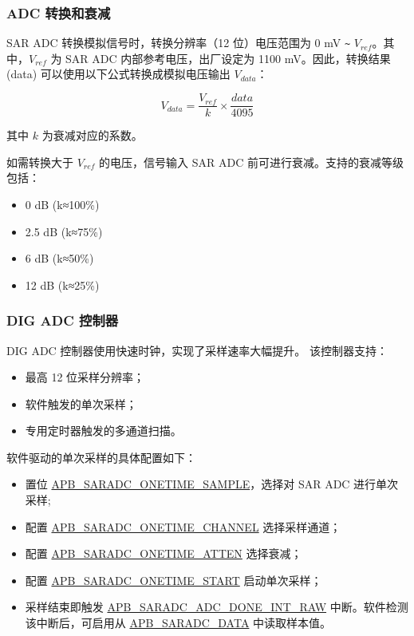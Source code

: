 \documentclass[main\_\_CN.tex]{subfiles}
\begin{document}
\subsubsection{ADC 转换和衰减}

SAR ADC 转换模拟信号时，转换分辨率（12 位）电压范围为 0 mV \verb+~+ \(V_{ref}\)。其中，\(V_{ref}\) 为 SAR ADC 内部参考电压，出厂设定为 1100 mV。因此，转换结果 (data) 可以使用以下公式转换成模拟电压输出 \(V_{data}\)：

    \[
    V_{data} = \frac{V_{ref}}{k}\times{\frac{data}{4095}}
    \]

其中 \(k\) 为衰减对应的系数。

如需转换大于 \(V_{ref}\) 的电压，信号输入 SAR ADC 前可进行衰减。支持的衰减等级包括：

\begin{itemize}
    \item 0 dB (k≈100\%)
    \item 2.5 dB (k≈75\%)
    \item 6 dB (k≈50\%)
    \item 12 dB (k≈25\%)
\end{itemize}

\subsubsection{DIG ADC 控制器}

DIG ADC 控制器使用快速时钟，实现了采样速率大幅提升。
该控制器支持：

\begin{itemize}
    \item 最高 12 位采样分辨率；
    \item 软件触发的单次采样；
    \item 专用定时器触发的多通道扫描。
\end{itemize}

软件驱动的单次采样的具体配置如下：
\begin{itemize}
    \item 置位 \hyperref[fielddesc:APBSARADCONETIMESAMPLE]{APB\_SARADC\_ONETIME\_SAMPLE}，选择对 SAR ADC 进行单次采样;
    \item 配置 \hyperref[fielddesc:APBSARADCONETIMECHANNEL]{APB\_SARADC\_ONETIME\_CHANNEL} 选择采样通道；
    \item 配置 \hyperref[fielddesc:APBSARADCONETIMEATTEN]{APB\_SARADC\_ONETIME\_ATTEN} 选择衰减；
    \item 配置 \hyperref[fielddesc:APBSARADCONETIMESTART]{APB\_SARADC\_ONETIME\_START} 启动单次采样；
    \item 采样结束即触发 \hyperref[fielddesc:APBSARADCDONEINTRAW]{APB\_SARADC\_ADC\_DONE\_INT\_RAW} 中断。软件检测该中断后，可启用从 \hyperref[fielddesc:APBSARADCDATA]{APB\_SARADC\_DATA} 中读取样本值。
\end{itemize}
\end{document}
